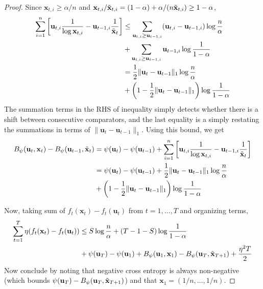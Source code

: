 \documentclass[12pt, a4paper]{report}
\begin{document}
\begin{proof}
Since $\mathbf{x}_{t, i} \geq \alpha/n$ and $\mathbf{x}_{t, i}/\Tilde{\mathbf{x}}_{t, i} = (1 - \alpha) + \alpha / (n\Tilde{\mathbf{x}}_{t, i}) \geq 1 - \alpha$,
\begin{align*}
    \sum_{i=1}^n \left[\mathbf{u}_{t, i} \frac{1}{\log \mathbf{x}_{t, i}} - \mathbf{u}_{t-1, i}\frac{1}{\Tilde{\mathbf{x}}_t} \right] &\leq \sum_{\mathbf{u}_{t, i} \geq \mathbf{u}_{t-1, i}} (\mathbf{u}_{t, i} - \mathbf{u}_{t-1, i}) \log \frac{n}{\alpha} 
    \\
    &+ \sum_{\mathbf{u}_{t, i} \geq \mathbf{u}_{t-1, i}} \mathbf{u}_{t-1, i} \log \frac{1}{1 - \alpha}
    \\
    &= \frac{1}{2} \lVert \mathbf{u}_t - \mathbf{u}_{t-1} \rVert_1 \log \frac{n}{\alpha} 
    \\
    &+ \left(1 - \frac{1}{2} \lVert \mathbf{u}_t - \mathbf{u}_{t-1} \rVert_1 \right) \log \frac{1}{1 - \alpha}
\end{align*}
The summation terms in the RHS of inequality simply detects whether there is a shift between consecutive comparators, and the last equality is a simply restating the summations in terms of $\lVert \mathbf{u}_t - \mathbf{u}_{t-1} \rVert_1$. Using this bound, we get
\begin{align*}
B_\psi(\mathbf{u}_t, \mathbf{x}_t) - B_\psi(\mathbf{u}_{t-1}, \Tilde{\mathbf{x}}_t) &= \psi(\mathbf{u}_t) - \psi(\mathbf{u}_{t-1}) + \sum_{i=1}^n \left[\mathbf{u}_{t, i} \frac{1}{\log \mathbf{x}_{t, i}} - \mathbf{u}_{t-1, i}\frac{1}{\Tilde{\mathbf{x}}_t} \right] 
\\
&= \psi(\mathbf{u}_t) - \psi(\mathbf{u}_{t-1}) + \frac{1}{2} \lVert \mathbf{u}_t - \mathbf{u}_{t-1} \rVert_1 \log \frac{n}{\alpha} 
\\
&+ \left(1 - \frac{1}{2}\lVert \mathbf{u}_t - \mathbf{u}_{t-1} \rVert_1 \right)\log\frac{1}{1-\alpha}
\end{align*}

Now, taking sum of $f_t(\mathbf{x}_t) - f_t(\mathbf{u}_t)$ from $t = 1, \dots, T$ and organizing terms,
\begin{align*}
    \sum_{t=1}^T \eta(f_t(\mathbf{x}_t) - f_t(\mathbf{u}_t)) &\leq S \log \frac{n}{\alpha} + \left(T-1-S\right) \log \frac{1}{1-\alpha} 
    \\
    &+ \psi(\mathbf{u}_T) - \psi(\mathbf{u}_1) + B_\psi(\mathbf{u}_1, \mathbf{x}_1) - B_\psi(\mathbf{u}_T, \Tilde{\mathbf{x}}_{T+1}) + \frac{\eta^2 T}{2}
\end{align*}
Now conclude by noting that negative cross entropy is always non-negative (which bounds $\psi(\mathbf{u}_T) - B_\psi(\mathbf{u}_T, \Tilde{\mathbf{x}}_{T+1})$) and that $\mathbf{x}_1 = (1/n, \dots, 1/n)$.
\end{proof}
\end{document}
